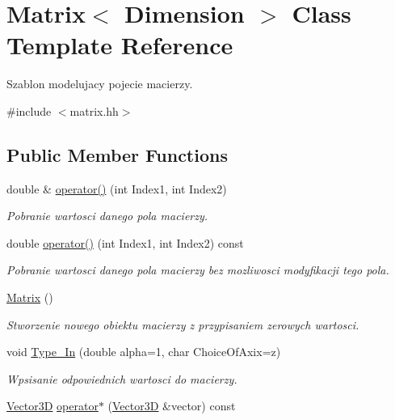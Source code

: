\hypertarget{class_matrix}{}\section{Matrix$<$ Dimension $>$ Class Template Reference}
\label{class_matrix}


Szablon modelujacy pojecie macierzy.  




{\ttfamily \#include $<$matrix.\+hh$>$}

\subsection*{Public Member Functions}
\begin{DoxyCompactItemize}
\item 
double \& \hyperlink{class_matrix_afff1ac83775f029d4bf9e472fff2b27e}{operator()} (int Index1, int Index2)
\begin{DoxyCompactList}\small\item\em Pobranie wartosci danego pola macierzy. \end{DoxyCompactList}\item 
double \hyperlink{class_matrix_a177a108c9b4631a0ef268c88b1aaf677}{operator()} (int Index1, int Index2) const 
\begin{DoxyCompactList}\small\item\em Pobranie wartosci danego pola macierzy bez mozliwosci modyfikacji tego pola. \end{DoxyCompactList}\item 
\hyperlink{class_matrix_ad3ddae5930748134cb331bf0bb508b86}{Matrix} ()
\begin{DoxyCompactList}\small\item\em Stworzenie nowego obiektu macierzy z przypisaniem zerowych wartosci. \end{DoxyCompactList}\item 
void \hyperlink{class_matrix_a25f743bb00f51eec66fc020f0600b2df}{Type\+\_\+\+In} (double alpha=1, char Choice\+Of\+Axix=\textquotesingle{}z\textquotesingle{})
\begin{DoxyCompactList}\small\item\em Wpsisanie odpowiednich wartosci do macierzy. \end{DoxyCompactList}\item 
\hyperlink{vector3_d_8hh_a8790ef07836c1639da216f46501979c0}{Vector3D} \hyperlink{class_matrix_a0db7f73a11fbe9a85d029d677c89582a}{operator$\ast$} (\hyperlink{vector3_d_8hh_a8790ef07836c1639da216f46501979c0}{Vector3D} \&vector) const 

\end{DoxyCompactItemize}
